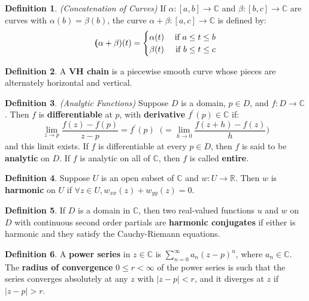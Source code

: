 \documentclass[a4paper]{article}
\theoremstyle{definition}
\newtheorem{definition}{Definition}
\begin{document}
	\begin{definition}
		\emph{(Concatenation of Curves)}
		If $\alpha : [a,b] \rightarrow \mathbb{C}$ and $\beta : [b,c] \rightarrow \mathbb{C}$ are curves with $\alpha(b) = \beta(b)$, the curve $\alpha + \beta : [a,c] \rightarrow \mathbb{C}$ is defined by:
		\begin{eqnarray*}
			\textbf (\alpha + \beta)(t) = \left\{\def\arraystretch{1.2}%
			\begin{array}{@{}c@{\quad}r@{}}
				\alpha(t) & \;\text{if $a \leq t \leq b$}\\
				\beta(t) & \;\text{if $b \leq t \leq c$}\\
			\end{array}\right.
		\end{eqnarray*}
	\end{definition}
	
	\begin{definition}
		A \textbf{VH chain} is a piecewise smooth curve whose pieces are alternately horizontal and vertical.
	\end{definition}
	
	\begin{definition}
		\emph{(Analytic Functions)}
		Suppose $D$ is a domain, $p \in D$, and $f : D \rightarrow \mathbb{C}$. Then $f$ is \textbf{differentiable} at $p$, with \textbf{derivative} $f^{\prime}(p) \in \mathbb{C}$ if:
		$$\lim_{z \rightarrow p} \frac{f(z) - f(p)}{z - p} = f^{\prime}(p) \; \; \bigg( = \lim_{h \rightarrow 0} \frac{f(z + h) - f(z)}{h} \bigg)$$
		and this limit exists. If $f$ is differentiable at every $p \in D$, then $f$ is said to be \textbf{analytic} on $D$. If $f$ is analytic on all of $\mathbb{C}$, then $f$ is called \textbf{entire}.
	\end{definition}
	
	\begin{definition}
		Suppose $U$ is an open subset of $\mathbb{C}$ and $w : U \rightarrow \mathbb{R}$. Then $w$ is \textbf{harmonic} on $U$ if $\forall z \in U, w_{xx}(z) + w_{yy}(z) = 0$.
	\end{definition}
	
	\begin{definition}
		If $D$ is a domain in $\mathbb{C}$, then two real-valued functions $u$ and $w$ on $D$ with continuous second order partials are \textbf{harmonic conjugates} if either is harmonic and they satisfy the Cauchy-Riemann equations.
	\end{definition}
	
	\begin{definition}
		A \textbf{power series} in $z \in \mathbb{C}$ is $\sum_{n=0}^{\infty} a_{n}(z-p)^{n}$, where $a_{n} \in \mathbb{C}$. The \textbf{radius of convergence} $0 \leq r < \infty$ of the power series is such that the series converges absolutely at any $z$ with $|z-p| < r$, and it diverges at $z$ if $|z-p| > r$.
	\end{definition}
	
\end{document}
